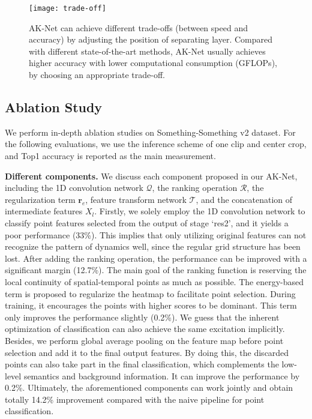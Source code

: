 \documentclass[journal]{IEEEtran}
\begin{document}
\begin{figure}[ht]
	\centering
	\texttt{[image: trade-off]}
	\caption{AK-Net can achieve different trade-offs (between speed and accuracy) by adjusting the position of separating layer. Compared with different state-of-the-art methods, AK-Net usually achieves higher accuracy with lower computational consumption (GFLOPs), by choosing an appropriate trade-off.} 
	\label{fig:layers}
\end{figure}

\subsection{Ablation Study} \label{sec:ablation}
We perform in-depth ablation studies on Something-Something v2 dataset.
For the following evaluations, we use the inference scheme of one clip and center crop, and Top1 accuracy is reported as the main measurement.

\textbf{Different components.}
We discuss each component proposed in our AK-Net, including the 1D convolution network $\mathcal{Q}$, the ranking operation $\mathcal{R}$, the regularization term $\mathbf{r}_e$, feature transform network $\mathcal{T}$, and the concatenation of intermediate features $X_l$.
Firstly, we solely employ the 1D convolution network to classify point features selected from the output of stage `res2', and it yields a poor performance (33\%).
This implies that only utilizing original features can not recognize the pattern of dynamics well, since the regular grid structure has been lost.
After adding the ranking operation, the performance can be improved with a significant margin (12.7\%). 
The main goal of the ranking function is reserving the local continuity of spatial-temporal points as much as possible.
The energy-based term is proposed to regularize the heatmap to facilitate point selection.
During training, it encourages the points with higher scores to be dominant.
This term only improves the performance slightly (0.2\%).
We guess that the inherent optimization of classification can also achieve the same excitation implicitly.
Besides, we perform global average pooling on the feature map before point selection and add it to the final output features.
By doing this, the discarded points can also take part in the final classification, which complements the low-level semantics and background information.
It can improve the performance by 0.2\%.
Ultimately, the aforementioned components can work jointly and obtain totally 14.2\% improvement compared with the naive pipeline for point classification.
\end{document}
